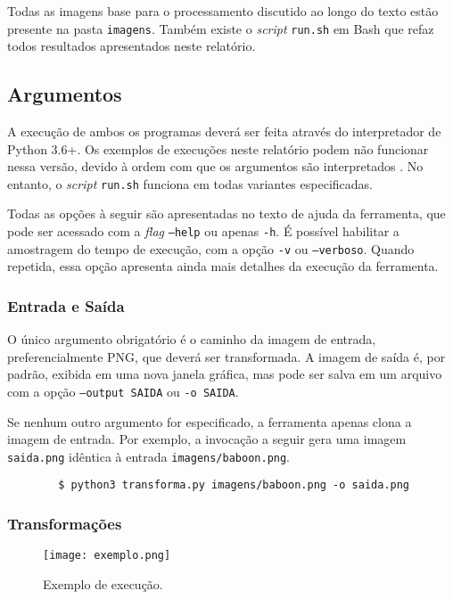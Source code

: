     Todas as imagens base para o processamento discutido ao longo do texto estão presente na pasta \texttt{imagens}. Também existe o \textit{script} \texttt{run.sh} em Bash que refaz todos resultados apresentados neste relatório.

\subsection{Argumentos}

    A execução de ambos os programas deverá ser feita através do interpretador de Python 3.6+. Os exemplos de execuções neste relatório podem não funcionar nessa versão, devido à ordem com que os argumentos são interpretados \autocite{intermixed}. No entanto, o \textit{script} \texttt{run.sh} funciona em todas variantes especificadas.

    Todas as opções à seguir são apresentadas no texto de ajuda da ferramenta, que pode ser acessado com a \textit{flag} \texttt{--help} ou apenas \texttt{-h}. É possível habilitar a amostragem do tempo de execução, com a opção \texttt{-v} ou \texttt{--verboso}. Quando repetida, essa opção apresenta ainda mais detalhes da execução da ferramenta.

\subsubsection{Entrada e Saída}

    O único argumento obrigatório é o caminho da imagem de entrada, preferencialmente PNG, que deverá ser transformada. A imagem de saída é, por padrão, exibida em uma nova janela gráfica, mas pode ser salva em um arquivo com a opção \texttt{--output SAIDA} ou \texttt{-o SAIDA}.

    Se nenhum outro argumento for especificado, a ferramenta apenas clona a imagem de entrada. Por exemplo, a invocação a seguir gera uma imagem \texttt{saida.png} idêntica à entrada \texttt{imagens/baboon.png}.

    \begin{verbatim}
        $ python3 transforma.py imagens/baboon.png -o saida.png
    \end{verbatim}

\subsubsection{Transformações}

    \begin{wrapfigure}{L}{0.25\textwidth}
        \centering
        \texttt{[image: exemplo.png]}
        \caption{Exemplo de execução.}
        \label{fig:exemplo}
    \end{wrapfigure}

